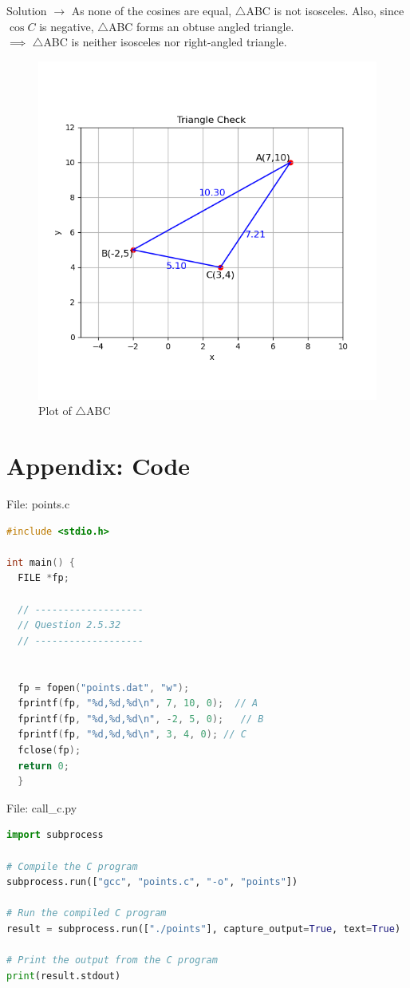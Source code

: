\documentclass{beamer}
\numberwithin{equation}{section}
\theoremstyle{remark}
\begin{document}
\begin{frame}{Solution}
$\rightarrow$ As none of the cosines are equal, $\triangle$ABC is not isosceles. Also, since $\cos{C}$ is negative, $\triangle$ABC forms an obtuse angled triangle. \\
$\implies$ $\triangle$ABC is neither isosceles nor right-angled triangle.
\begin{figure}[h!]
   \centering
   \includegraphics[width=0.5\linewidth]{figs/01.png}
   \caption{Plot of $\triangle$ABC}
   \label{Plot_1}
\end{figure}
\end{frame}

\section*{Appendix: Code}

\begin{frame}[fragile]{File: points.c}
\begin{lstlisting}[language=C]
#include <stdio.h>

int main() {
  FILE *fp;

  // -------------------
  // Question 2.5.32
  // -------------------


  fp = fopen("points.dat", "w");
  fprintf(fp, "%d,%d,%d\n", 7, 10, 0);  // A
  fprintf(fp, "%d,%d,%d\n", -2, 5, 0);   // B
  fprintf(fp, "%d,%d,%d\n", 3, 4, 0); // C
  fclose(fp);
  return 0;
  }
\end{lstlisting}
\end{frame}

\begin{frame}[fragile]{File: call\_c.py}
\begin{lstlisting}[language=Python]
import subprocess

# Compile the C program
subprocess.run(["gcc", "points.c", "-o", "points"])

# Run the compiled C program
result = subprocess.run(["./points"], capture_output=True, text=True)

# Print the output from the C program
print(result.stdout)
\end{lstlisting}
\end{frame}
\end{document}
